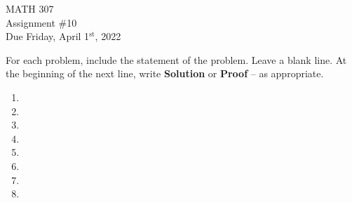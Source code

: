 \documentclass[12pt]{article}
\newcommand{\nl}{\vspace{0.1in}\noindent}
\begin{document}
\pagestyle{fancy}
\fancyhf{}

\noindent MATH 307 \\
Assignment \#10 \\  %
Due Friday, April 1$^{\text{st}}$, 2022

\nl For each problem, include the statement of the problem. Leave a blank line.  At the beginning of the next line, write \textbf{Solution} or \textbf{Proof} -- as appropriate.

\begin{enumerate}
  \item 
  \item \newpage
  \item \vspace{.75in}
  \item 
  \item  \newpage
  \item  \newpage
  \item  \newpage
  \item 
\end{enumerate}
\end{document}
